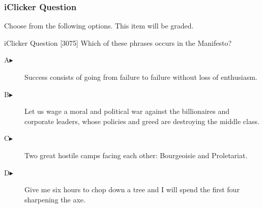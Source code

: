 \begin{frame}
  \frametitle{iClicker Question}
Choose from the following options. This item will be graded.
\begin{block}{iClicker Question}
[3075] Which of these phrases occurs in the Manifesto?
\end{block}
\begin{description}
\item[A\hspace{.2in}$\blacktriangleright$] Success consists of going from failure to failure without loss of enthusiasm.
\item[B\hspace{.2in}$\blacktriangleright$] Let us wage a moral and political war against the billionaires and corporate leaders, whose policies and greed are destroying the middle class.
\item[C\hspace{.2in}$\blacktriangleright$] Two great hostile camps facing each other: Bourgeoisie and Proletariat.
\item[D\hspace{.2in}$\blacktriangleright$] Give me six hours to chop down a tree and I will spend the first four sharpening the axe.
\end{description}
\end{frame}